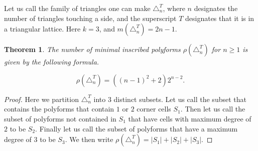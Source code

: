 \documentclass[12pt]{article}
\newtheorem{theorem}{Theorem}
\theoremstyle{plain}
\theoremstyle{definition}
\theoremstyle{remark}
\theoremstyle{definition}
\begin{document}
Let us call the family of triangles one can make $\triangle^{T}_n$, where $n$ designates the number of triangles touching a side, and the superscript $T$ designates that it is in a triangular lattice. Here $k=3$, and $m(\triangle^T_n) = 2n-1$. 

\begin{theorem}\label{thm: tri in tri}
The number of minimal inscribed polyforms $\rho(\triangle^T_n)$ for $n \geq 1$ is given by the following formula.

\begin{equation}\label{eq: triangle in triangle}
    \rho(\triangle^T_n) = ((n-1)^2 +2)2^{n-2}.
\end{equation}
\end{theorem}

\begin{proof}

Here we partition $\triangle^{T}_n$ into $3$ distinct subsets. Let us call the subset that contains the polyforms that contain $1$ or $2$ corner cells $S_1$. Then let us call the subset of polyforms not contained in $S_1$ that have cells with maximum degree of $2$ to be $S_2$. Finally let us call the subset of polyforms that have a maximum degree of $3$ to be $S_3$. We then write $\rho(\triangle^T_n) = |S_1| + |S_2| + |S_3|$.


\end{proof}
\end{document}
